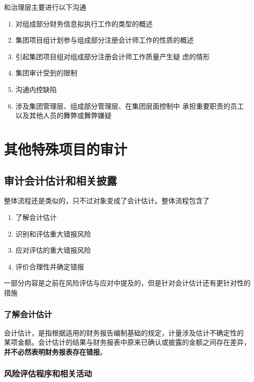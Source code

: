 \documentclass[UTF8,12pt]{ctexart}
\numberwithin{equation}{section} %
\numberwithin{figure}{section}
\numberwithin{table}{section}
\begin{document}
	和治理层主要进行以下沟通
	\begin{enumerate}
		\item 对组成部分财务信息拟执行工作的类型的概述
		
		\item 集团项目组计划参与组成部分注册会计师工作的性质的概述
		
		\item 引起集团项目组对组成部分注册会计师工作质量产生疑 虑的情形
		
		\item 集团审计受到的限制
		
		\item 沟通内控缺陷
		
		\item 涉及集团管理层、组成部分管理层、在集团层面控制中 承担重要职责的员工以及其他人员的舞弊或舞弊嫌疑
	\end{enumerate}
	
	\newpage
	\section{其他特殊项目的审计}
	
	\subsection{审计会计估计和相关披露}
	整体流程还是类似的，只不过对象变成了会计估计。整体流程包含了
	\begin{enumerate}
		\item 了解会计估计
		
		\item 识别和评估重大错报风险
		
		\item 应对评估的重大错报风险
		
		\item 评价合理性并确定错报
	\end{enumerate}
	一部分内容是之前在风险评估与应对中提及的，但是针对会计估计还有更针对性的措施
	
	\subsubsection{了解会计估计}
	会计估计，是指根据适用的财务报告编制基础的规定，计量涉及估计不确定性的 某项金额。会计估计的结果与财务报表中原来已确认或披露的金额之间存在差异，\textbf{并不必然表明财务报表存在错报}。
	
	\subsubsection{风险评估程序和相关活动}
\end{document}

